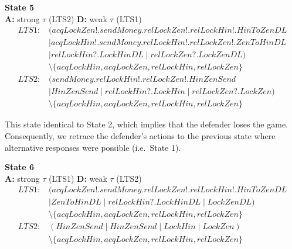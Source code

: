 \documentclass{report}
\begin{document}
\begin{mdframed}
\textbf{State 5} \\
\textbf{A:} strong $\tau$ (LTS2) \quad \textbf{D:} weak $\tau$ (LTS1)
\begin{align*}
\textit{LTS1:}\; & (\mathit{acqLockZen!}.\mathit{sendMoney}.\mathit{relLockZen!}.\mathit{relLockHin!}.\mathit{HinToZenDL} \\
                 & \mid \mathit{acqLockHin!}.\mathit{sendMoney}.\mathit{relLockHin!}.\mathit{relLockZen!}.\mathit{ZenToHinDL} \\
                 & \mid \mathit{relLockHin?}.\mathit{LockHinDL} \mid \mathit{relLockZen?}.\mathit{LockZenDL}) \\
                 & \setminus \{\mathit{acqLockHin}, \mathit{acqLockZen}, \mathit{relLockHin}, \mathit{relLockZen}\} \\[6pt]
\textit{LTS2:}\; & (\mathit{sendMoney}.\mathit{relLockHin!}.\mathit{relLockZen!}.\mathit{HinZenSend} \\
                 & \mid \mathit{HinZenSend} \mid \mathit{relLockHin?}.\mathit{LockHin} \mid \mathit{relLockZen?}.\mathit{LockZen}) \\
                 & \setminus \{\mathit{acqLockHin}, \mathit{acqLockZen}, \mathit{relLockHin}, \mathit{relLockZen}\}
\end{align*}
\end{mdframed}

\noindent This state identical to State 2, which implies that the defender loses the game.  Consequently, we retrace the defender's actions to the previous state where alternative responses were possible (i.e.\ State 1).

\begin{mdframed}
\textbf{State 6} \\
\textbf{A:} strong $\tau$ (LTS1) \quad \textbf{D:} weak $\tau$ (LTS2)
\begin{align*}
\textit{LTS1:}\; & (\mathit{acqLockZen!}.\mathit{sendMoney}.\mathit{relLockZen!}.\mathit{relLockHin!}.\mathit{HinToZenDL} \\
                 & \mid \mathit{ZenToHinDL} \mid \mathit{relLockHin?}.\mathit{LockHinDL} \mid \mathit{LockZenDL}) \\
                 & \setminus \{\mathit{acqLockHin}, \mathit{acqLockZen}, \mathit{relLockHin}, \mathit{relLockZen}\} \\[6pt]
\textit{LTS2:}\; & (\mathit{HinZenSend} \mid \mathit{HinZenSend} \mid \mathit{LockHin} \mid \mathit{LockZen}) \\
                 & \setminus \{\mathit{acqLockHin}, \mathit{acqLockZen}, \mathit{relLockHin}, \mathit{relLockZen}\}
\end{align*}
\end{mdframed}
\end{document}
